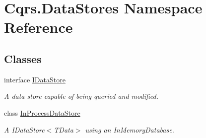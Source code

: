 \hypertarget{namespaceCqrs_1_1DataStores}{}\section{Cqrs.\+Data\+Stores Namespace Reference}
\label{namespaceCqrs_1_1DataStores}
\subsection*{Classes}
\begin{DoxyCompactItemize}
\item 
interface \hyperlink{interfaceCqrs_1_1DataStores_1_1IDataStore}{I\+Data\+Store}
\begin{DoxyCompactList}\small\item\em A data store capable of being queried and modified. \end{DoxyCompactList}\item 
class \hyperlink{classCqrs_1_1DataStores_1_1InProcessDataStore}{In\+Process\+Data\+Store}
\begin{DoxyCompactList}\small\item\em A I\+Data\+Store$<$\+T\+Data$>$ using an In\+Memory\+Database. \end{DoxyCompactList}\end{DoxyCompactItemize}
